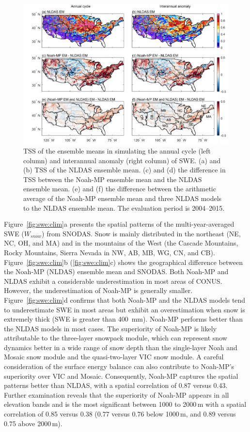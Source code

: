 \documentclass[essd, manuscript]{copernicus}
\begin{document}
\begin{figure}[t]
  \includegraphics[width=17cm]{fig/fig09.pdf}
  \caption{TSS of the ensemble means in simulating the annual cycle (left column) and interannual anomaly (right column) of SWE\@. (a) and (b) TSS of the NLDAS ensemble mean. (c) and (d) the difference in TSS between the Noah-MP ensemble mean and the NLDAS ensemble mean. (e) and (f) the difference between the arithmetic average of the Noah-MP ensemble mean and three NLDAS models to the NLDAS ensemble mean. The evaluation period is 2004--2015.}
  \label{fig:swe:tss}
\end{figure}

Figure~\ref{fig:swe:clim}a presents the spatial patterns of the multi-year-averaged SWE (\(W_{snow}\)) from SNODAS\@. Snow is mainly distributed in the northeast (NE, NC, OH, and MA) and in the mountains of the West (the Cascade Mountains, Rocky Mountains, Sierra Nevada in NW, AB, MB, WG, CN, and CB). Figure~\ref{fig:swe:clim}b (\ref{fig:swe:clim}c) shows the geographical difference between the Noah-MP (NLDAS) ensemble mean and SNODAS\@. Both Noah-MP and NLDAS exhibit a considerable underestimation in most areas of CONUS\@. However, the underestimation of Noah-MP is generally smaller. Figure~\ref{fig:swe:clim}d confirms that both Noah-MP and the NLDAS models tend to underestimate SWE in most areas but exhibit an overestimation when snow is extremely thick (SWE is greater than \qty{400}{mm}). Noah-MP performs better than the NLDAS models in most cases. The superiority of Noah-MP is likely attributable to the three-layer snowpack module, which can represent snow dynamics better in a wide range of snow depth than the single-layer Noah and Mosaic snow module and the quasi-two-layer VIC snow module. A careful consideration of the surface energy balance can also contribute to Noah-MP's superiority over VIC and Mosaic. Consequently, Noah-MP captures the spatial patterns better than NLDAS, with a spatial correlation of 0.87 versus 0.43. Further examination reveals that the superiority of Noah-MP appears in all elevation bands and is the most significant between 1000 to 2000\,m with a spatial correlation of 0.85 versus 0.38 (0.77 versus 0.76 below 1000\,m, and 0.89 versus 0.75 above 2000\,m).
\end{document}
